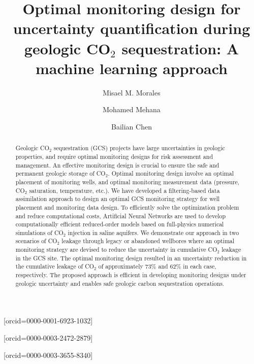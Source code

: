 \documentclass[a4paper,fleqn]{cas-sc}
\begin{document}
\let\WriteBookmarks\relax
\def\floatpagepagefraction{1}
\def\textpagefraction{.001}

\shorttitle{}

\title [mode = title]{Optimal monitoring design for uncertainty quantification during geologic CO$_2$ sequestration: A machine learning approach}                      

\author[1,2]{Misael M. Morales}[orcid=0000-0001-6923-1032]
\cormark[1]

\author[1]{Mohamed Mehana}[orcid=0000-0003-2472-2879]
\cormark[1]

\author[1]{Bailian Chen}[orcid=0000-0003-3655-8340]




\begin{abstract}
Geologic CO$_2$ sequestration (GCS) projects have large uncertainties in geologic properties, and require optimal monitoring designs for risk assessment and management. An effective monitoring design is crucial to ensure the safe and permanent geologic storage of CO$_2$. Optimal monitoring design involve an optimal placement of monitoring wells, and optimal monitoring measurement data (pressure, CO$_2$ saturation, temperature, etc.). We have developed a filtering-based data assimilation approach to design an optimal GCS monitoring strategy for well placement and monitoring data design. To efficiently solve the optimization problem and reduce computational costs, Artificial Neural Networks are used to develop computationally efficient reduced-order models based on full-physics numerical simulations of CO$_2$ injection in saline aquifers. We demonstrate our approach in two scenarios of CO$_2$ leakage through legacy or abandoned wellbores where an optimal monitoring strategy are devised to reduce the uncertainty in cumulative CO$_2$ leakage in the GCS site. The optimal monitoring design resulted in an uncertainty reduction in the cumulative leakage of CO$_2$ of approximately $73\%$ and $62\%$ in each case, respectively. The proposed approach is efficient in developing monitoring designs under geologic uncertainty and enables safe geologic carbon sequestration operations.
\end{abstract}
\end{document}
